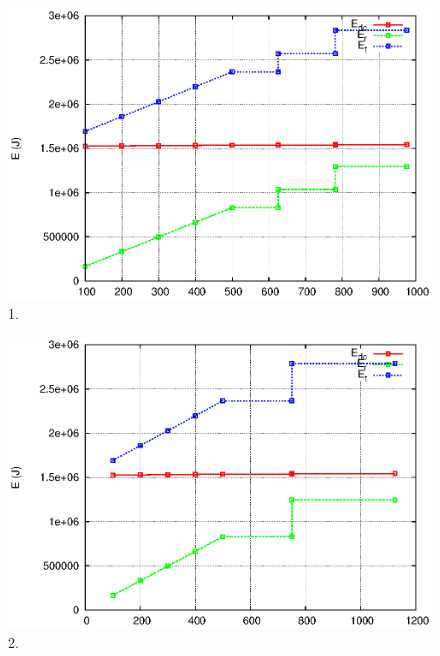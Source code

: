 \documentclass[JIP]{ipsj}
\begin{document}
\begin{figure}[thb]
\begin{center}
\includegraphics[scale=0.5]{graphs/cdnp2p-1.eps}
\end{center}
\caption{1.}
\label{fig:4-1}
\vspace{-2mm}
\end{figure} 

\begin{figure}[thb]
\begin{center}
\includegraphics[scale=0.5]{graphs/cdnp2p-2.eps}
\end{center}
\caption{2.}
\label{fig:4-2}
\vspace{-2mm}
\end{figure} 
\end{document}
